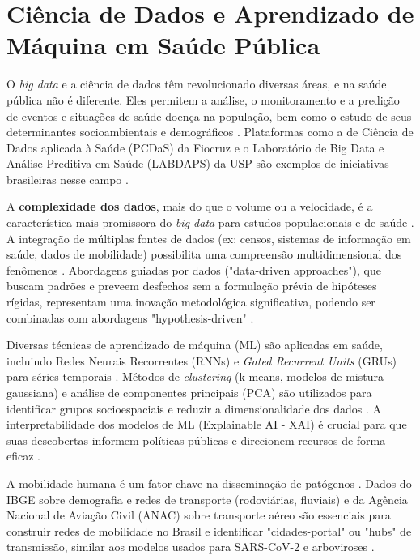 \documentclass{article}
\begin{document}
\section{Ciência de Dados e Aprendizado de Máquina em Saúde Pública}
O \textit{big data} e a ciência de dados têm revolucionado diversas áreas, e na saúde pública não é diferente. Eles permitem a análise, o monitoramento e a predição de eventos e situações de saúde-doença na população, bem como o estudo de seus determinantes socioambientais e demográficos \cite{saldanha2021ciencia}. Plataformas como a de Ciência de Dados aplicada à Saúde (PCDaS) da Fiocruz e o Laboratório de Big Data e Análise Preditiva em Saúde (LABDAPS) da USP são exemplos de iniciativas brasileiras nesse campo \cite{saldanha2021ciencia}.

A \textbf{complexidade dos dados}, mais do que o volume ou a velocidade, é a característica mais promissora do \textit{big data} para estudos populacionais e de saúde \cite{saldanha2021ciencia}. A integração de múltiplas fontes de dados (ex: censos, sistemas de informação em saúde, dados de mobilidade) possibilita uma compreensão multidimensional dos fenômenos \cite{saldanha2021ciencia}. Abordagens guiadas por dados ("data-driven approaches"), que buscam padrões e preveem desfechos sem a formulação prévia de hipóteses rígidas, representam uma inovação metodológica significativa, podendo ser combinadas com abordagens "hypothesis-driven" \cite{saldanha2021ciencia}.

Diversas técnicas de aprendizado de máquina (ML) são aplicadas em saúde, incluindo Redes Neurais Recorrentes (RNNs) e \textit{Gated Recurrent Units} (GRUs) para séries temporais \cite{inovacao_computacional_hanseniase, messier_gru_preprocessing}. Métodos de \textit{clustering} (k-means, modelos de mistura gaussiana) e análise de componentes principais (PCA) são utilizados para identificar grupos socioespaciais e reduzir a dimensionalidade dos dados \cite{inovacao_computacional_hanseniase}. A interpretabilidade dos modelos de ML (Explainable AI - XAI) é crucial para que suas descobertas informem políticas públicas e direcionem recursos de forma eficaz \cite{bigdata_review, inovacao_computacional_hanseniase}.

A mobilidade humana é um fator chave na disseminação de patógenos \cite{inovacao_computacional_hanseniase}. Dados do IBGE sobre demografia e redes de transporte (rodoviárias, fluviais) e da Agência Nacional de Aviação Civil (ANAC) sobre transporte aéreo são essenciais para construir redes de mobilidade no Brasil e identificar "cidades-portal" ou "hubs" de transmissão, similar aos modelos usados para SARS-CoV-2 e arboviroses \cite{oliveira2024human, inovacao_computacional_hanseniase, silva2022machine}.
\end{document}
